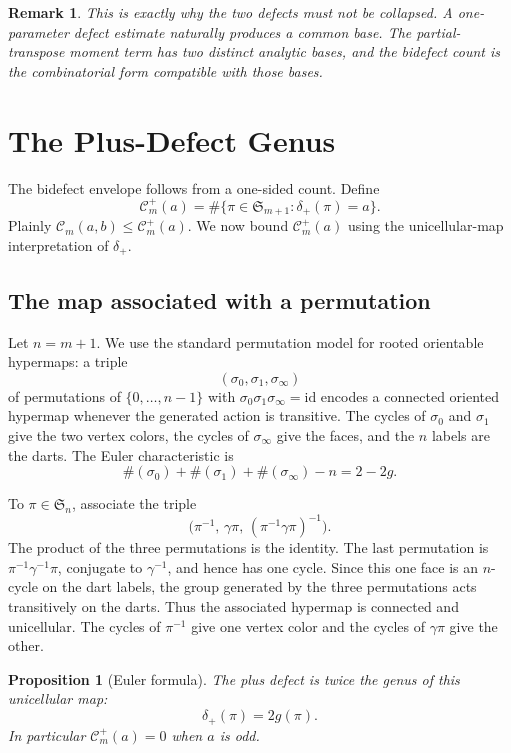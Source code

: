 \documentclass[11pt]{article}
\numberwithin{equation}{section}
\newtheorem{proposition}[theorem]{Proposition}
\newtheorem{remark}[theorem]{Remark}
\newcommand{\Sym}{\mathfrak S}
\newcommand{\cyc}{\#}
\newcommand{\id}{\mathrm{id}}
\newcommand{\g}{\gamma}
\newcommand{\ddp}{\delta_{+}}
\newcommand{\Count}{\mathcal C}
\newcommand{\Countp}{\mathcal C^{+}}
\begin{document}
\begin{remark}
This is exactly why the two defects must not be collapsed.  A one-parameter
defect estimate naturally produces a common base.  The partial-transpose
moment term has two distinct analytic bases, and the bidefect count is the
combinatorial form compatible with those bases.
\end{remark}

\section{The Plus-Defect Genus}

The bidefect envelope follows from a one-sided count.  Define
\[
  \Countp_m(a)=\#\{\pi\in\Sym_{m+1}:\ddp(\pi)=a\}.
\]
Plainly \(\Count_m(a,b)\le \Countp_m(a)\).  We now bound
\(\Countp_m(a)\) using the unicellular-map interpretation of \(\ddp\).

\subsection{The map associated with a permutation}

Let \(n=m+1\).  We use the standard permutation model for rooted orientable
hypermaps: a triple
\[
  (\sigma_0,\sigma_1,\sigma_\infty)
\]
of permutations of \(\{0,\ldots,n-1\}\) with
\(\sigma_0\sigma_1\sigma_\infty=\id\) encodes a connected oriented hypermap
whenever the generated action is transitive.  The cycles of \(\sigma_0\) and
\(\sigma_1\) give the two vertex colors, the cycles of \(\sigma_\infty\) give
the faces, and the \(n\) labels are the darts.  The Euler characteristic is
\[
  \cyc(\sigma_0)+\cyc(\sigma_1)+\cyc(\sigma_\infty)-n=2-2g.
\]

To \(\pi\in\Sym_n\), associate the triple
\[
  \bigl(\pi^{-1},\,\g\pi,\,(\pi^{-1}\g\pi)^{-1}\bigr).
\]
The product of the three permutations is the identity.  The last permutation
is \(\pi^{-1}\g^{-1}\pi\), conjugate to \(\g^{-1}\), and hence has one
cycle.  Since this one face is an \(n\)-cycle on the dart labels, the group
generated by the three permutations acts transitively on the darts.  Thus the
associated hypermap is connected and unicellular.  The cycles of
\(\pi^{-1}\) give one vertex color and the cycles of \(\g\pi\) give the
other.

\begin{proposition}[Euler formula]\label{prop:euler}
The plus defect is twice the genus of this unicellular map:
\[
  \ddp(\pi)=2g(\pi).
\]
In particular \(\Countp_m(a)=0\) when \(a\) is odd.
\end{proposition}
\end{document}
